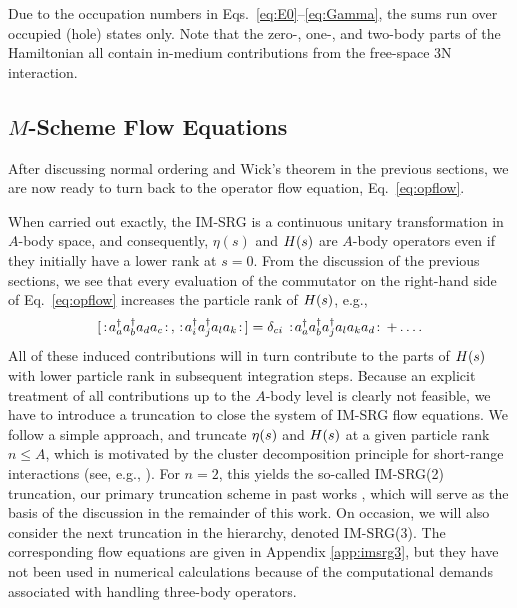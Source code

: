 Due to the occupation numbers in Eqs.~\eqref{eq:E0}--\eqref{eq:Gamma}, the sums run over occupied (hole) states only. Note that the zero-, one-, and two-body parts of the Hamiltonian all contain in-medium contributions from the free-space 3N interaction. 

\subsection{\texorpdfstring{$M$}{M}-Scheme Flow Equations}
After discussing normal ordering and Wick's theorem in the previous sections, we are now ready to turn back to the operator flow equation, Eq.~\eqref{eq:opflow}. 

When carried out exactly, the IM-SRG is a continuous unitary transformation in $A$-body space, and consequently, $\eta(s)$ and $H(s)$ are $A$-body operators even if they initially have a lower rank at $s=0$. From the discussion of the previous sections, we see that every evaluation of the commutator on the right-hand side of Eq.~\eqref{eq:opflow} increases the particle rank of $H(s)$, e.g.,
\begin{equation}\label{eq:induced}
  \comm{\nord{\aaO_{a}\aaO_{b}\aO_{d}\aO_{c}}}{\nord{\aaO_{i}\aaO_{j}\aO_{l}\aO_{k}}}= \delta_{ci}\nord{\aaO_{a}\aaO_{b}\aaO_{j}\aO_{l}\aO_{k}\aO_{d}}+\ldots.
\end{equation}
All of these induced contributions will in turn contribute to the parts of $H(s)$ with lower particle rank in subsequent integration steps. Because an explicit treatment of all contributions up to the $A$-body level is clearly not feasible, we have to introduce a truncation to close the system of IM-SRG flow equations. We follow a simple approach, and truncate $\eta(s)$ and $H(s)$ at a given particle rank $n\leq A$, which is motivated by the cluster decomposition principle for short-range interactions (see, e.g., \cite{Weinberg:1996uf}). For $n=2$, this yields the so-called IM-SRG(2) truncation, our primary truncation scheme in past works \cite{Tsukiyama:2011uq,Tsukiyama:2012fk,Hergert:2013mi}, which will serve as the basis of the discussion in the remainder of this work. On occasion, we will also consider the next truncation in the hierarchy, denoted IM-SRG(3). The corresponding flow equations are given in Appendix \ref{app:imsrg3}, but they have not been used in numerical calculations because of the computational demands associated with handling three-body operators.

